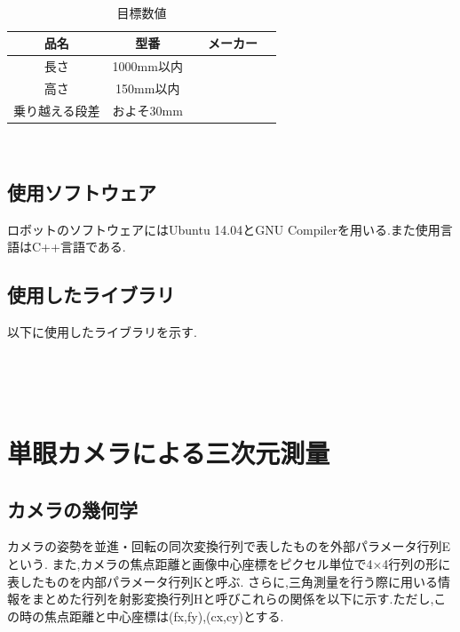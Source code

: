 \documentclass[12pt,oneside]{sotsuken_paper}
\begin{document}
\begin{table}[htp]
 　\begin{center}
    \caption{目標数値}
  \begin{tabular}{|c|c|c|c|} \hline
品名 & 型番 &　メーカー  \\  \hline
長さ & 1000mm以内 &\\ \hline
高さ & 150mm以内 &\\ \hline
乗り越える段差 & およそ30mm &  \\ \hline
  \end{tabular}
　   \label{tab:denkibuhin}
  \end{center}
\end{table}

\section{使用ソフトウェア}
ロボットのソフトウェアにはUbuntu 14.04とGNU Compilerを用いる.また使用言語はC++言語である.

\section{使用したライブラリ}
以下に使用したライブラリを示す.
\begin{table}[h]
 　\begin{center}
    \caption{使用したライブラリ}
    \small
　   \label{tab:op}
  \end{center}
\end{table}
\chapter{単眼カメラによる三次元測量}
\section{カメラの幾何学}
カメラの姿勢を並進・回転の同次変換行列で表したものを外部パラメータ行列Eという.
また,カメラの焦点距離と画像中心座標をピクセル単位で4×4行列の形に表したものを内部パラメータ行列Kと呼ぶ.
さらに,三角測量を行う際に用いる情報をまとめた行列を射影変換行列Hと呼びこれらの関係を以下に示す.ただし,この時の焦点距離と中心座標は(fx,fy),(cx,cy)とする.
\end{document}
